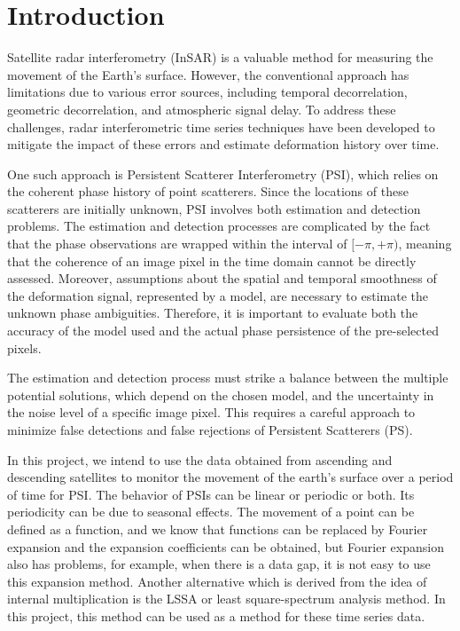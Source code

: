 \documentclass[12pt]{article}
\begin{document}
\section{Introduction}

Satellite radar interferometry (InSAR) is a valuable method for measuring the movement of the Earth's surface. However, the conventional approach has limitations due to various error sources, including temporal decorrelation, geometric decorrelation, and atmospheric signal delay. To address these challenges, radar interferometric time series techniques have been developed to mitigate the impact of these errors and estimate deformation history over time.

One such approach is Persistent Scatterer Interferometry (PSI), which relies on the coherent phase history of point scatterers. Since the locations of these scatterers are initially unknown, PSI involves both estimation and detection problems. The estimation and detection processes are complicated by the fact that the phase observations are wrapped within the interval of $[-\pi, +\pi)$, meaning that the coherence of an image pixel in the time domain cannot be directly assessed. Moreover, assumptions about the spatial and temporal smoothness of the deformation signal, represented by a model, are necessary to estimate the unknown phase ambiguities. Therefore, it is important to evaluate both the accuracy of the model used and the actual phase persistence of the pre-selected pixels.

The estimation and detection process must strike a balance between the multiple potential solutions, which depend on the chosen model, and the uncertainty in the noise level of a specific image pixel. This requires a careful approach to minimize false detections and false rejections of Persistent Scatterers (PS).


In this project, we intend to use the data obtained from ascending and descending satellites to monitor the movement of the earth's surface over a period of time for PSI.
The behavior of PSIs can be linear or periodic or both. Its periodicity can be due to seasonal effects. The movement of a point can be defined as a function, and we know that functions can be replaced by Fourier expansion and the expansion coefficients can be obtained, but Fourier expansion also has problems, for example, when there is a data gap, it is not easy to use this expansion method. Another alternative which is derived from the idea of internal multiplication is the LSSA or least square-spectrum analysis method. In this project, this method can be used as a method for these time series data.
\newpage
\end{document}
